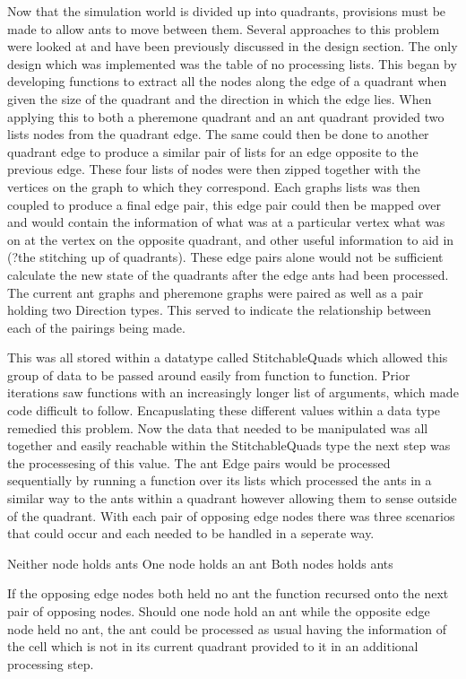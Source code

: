 \documentclass[main.tex]{subfiles}
\begin{document}
Now that the simulation world is divided up into quadrants, provisions must be made to allow ants to move between them. Several approaches to this problem were looked at and have been previously discussed in the design section. The only design which was implemented was the table of no processing lists. This began by developing functions to extract all the nodes along the edge of a quadrant when given the size of the quadrant and the direction in which the edge lies. When applying this to both a pheremone quadrant and an ant quadrant provided two lists nodes from the quadrant edge. The same could then be done to another quadrant edge to produce a similar pair of lists for an edge opposite to the previous edge.%
These four lists of nodes were then zipped together with the vertices on the graph to which they correspond. Each graphs lists was then coupled to produce a final edge pair, this edge pair could then be mapped over and would contain the information of what was at a particular vertex what was on at the vertex on the opposite quadrant, and other useful information to aid in (?the stitching up of quadrants). These edge pairs alone would not be sufficient calculate the new state of the quadrants after the edge ants had been processed. The current ant graphs and pheremone graphs were paired as well as a pair holding two Direction types. This served to indicate the relationship between each of the pairings being made.

This was all stored within a datatype called StitchableQuads which allowed this group of data to be passed around easily from function to function. Prior iterations saw functions with an increasingly longer list of arguments, which made code difficult to follow. Encapuslating these different values within a data type remedied this problem. Now the data that needed to be manipulated was all together and easily reachable within the StitchableQuads type the next step was the processesing of this value. The ant Edge pairs would be processed sequentially by running a function over its lists which processed the ants in a similar way to the ants within a quadrant however allowing them to sense outside of the quadrant. With each pair of opposing edge nodes there was three scenarios that could occur and each needed to be handled in a seperate way.

Neither node holds ants
One node holds an ant
Both nodes holds ants

If the opposing edge nodes both held no ant the function recursed onto the next pair of opposing nodes. Should one node hold an ant while the opposite edge node held no ant, the ant could be processed as usual having the information of the cell which is not in its current quadrant provided to it in an additional processing step.
\end{document}
